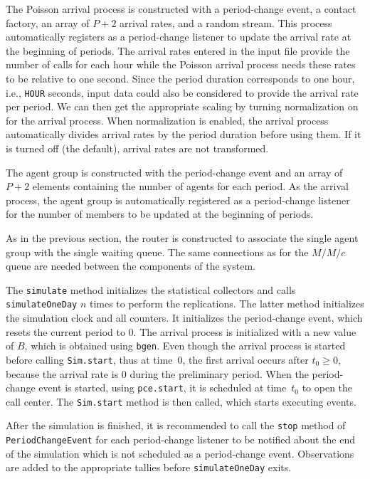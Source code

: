 The Poisson arrival process is constructed with a period-change event,
a contact factory, an array of $P+2$ arrival rates, and a random
stream.  This process automatically registers as a period-change
listener to update the arrival rate at the beginning of
periods.  The arrival rates entered in the input file provide the
number of calls for
each hour while the Poisson arrival process needs these rates to be
relative to one second.
Since the period duration corresponds to one hour, i.e.,
\texttt{HOUR} seconds, input data could also be considered to
provide the arrival rate per period.
We can then get the appropriate scaling by turning normalization on
for the arrival process. When normalization is
enabled, the arrival process automatically divides arrival rates
by the period duration before using them.  If it is turned off (the
default), arrival rates are not transformed.

The agent group is constructed with the period-change event and an
array of $P+2$ elements containing the number of agents for each
period.
As the arrival process, the agent group is automatically registered as
a period-change listener for the number of members to be updated at
the beginning of periods.

As in the previous section, the router is constructed to
associate the single agent group with the single waiting queue.  The
same connections as for the $M/M/c$ queue are needed between the
components of the system.

The \texttt{simulate} method initializes the statistical collectors
and calls \texttt{simulate\-One\-Day} $n$ times to perform
the replications.  The latter method initializes the simulation clock
and all counters.  It initializes the period-change event, which
resets the current period to 0.  The arrival process is initialized
with a new value of $B$, which is obtained using \texttt{bgen}.
Even though the arrival process is started before calling
\texttt{Sim.start}, thus at time~0, the first
arrival occurs after $t_0\ge 0$, because the arrival rate is 0 during
the preliminary period.  When the period-change event is started,
using \texttt{pce.start}, it is scheduled at time~$t_0$ to open the
call center.
The \texttt{Sim.start} method is then called, which starts
executing events.

After the simulation is finished, it is recommended to call the
\texttt{stop} method of \texttt{Period\-Change\-Event} for each
period-change
listener to be notified about the end of the simulation which is not
scheduled as a period-change event.
Observations are added to the appropriate tallies before
\texttt{simulate\-One\-Day} exits.

